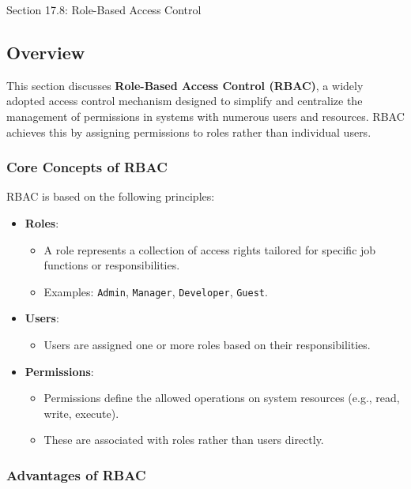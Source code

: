 \begin{notes}{Section 17.8: Role-Based Access Control}
    \subsection*{Overview}

    This section discusses \textbf{Role-Based Access Control (RBAC)}, a widely adopted access control mechanism designed to simplify and centralize the management of permissions in systems with 
    numerous users and resources. RBAC achieves this by assigning permissions to roles rather than individual users.
    
    \subsubsection*{Core Concepts of RBAC}
    
    RBAC is based on the following principles:
    \begin{itemize}
        \item \textbf{Roles}:
        \begin{itemize}
            \item A role represents a collection of access rights tailored for specific job functions or responsibilities.
            \item Examples: \texttt{Admin}, \texttt{Manager}, \texttt{Developer}, \texttt{Guest}.
        \end{itemize}
        \item \textbf{Users}:
        \begin{itemize}
            \item Users are assigned one or more roles based on their responsibilities.
        \end{itemize}
        \item \textbf{Permissions}:
        \begin{itemize}
            \item Permissions define the allowed operations on system resources (e.g., read, write, execute).
            \item These are associated with roles rather than users directly.
        \end{itemize}
    \end{itemize}
    
    \subsubsection*{Advantages of RBAC}
    

\end{notes}
